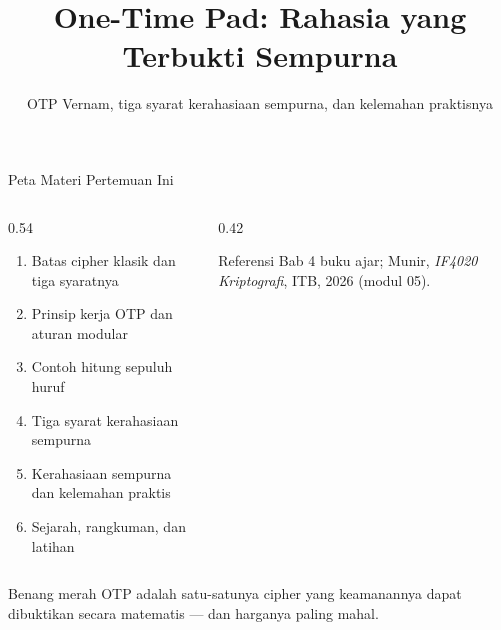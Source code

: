\documentclass[aspectratio=169,11pt]{beamer}
\title{One-Time Pad: Rahasia yang Terbukti Sempurna}
\subtitle{OTP Vernam, tiga syarat kerahasiaan sempurna, dan kelemahan praktisnya}
\begin{document}
\begin{frame}[plain]
    \titlepage
\end{frame}

\begin{frame}{Peta Materi Pertemuan Ini}
    \footnotesize
    \begin{columns}[T,onlytextwidth]
        \begin{column}{0.54\textwidth}
            \begin{enumerate}
                \item Batas cipher klasik dan tiga syaratnya
                \item Prinsip kerja OTP dan aturan modular
                \item Contoh hitung sepuluh huruf
                \item Tiga syarat kerahasiaan sempurna
                \item Kerahasiaan sempurna dan kelemahan praktis
                \item Sejarah, rangkuman, dan latihan
            \end{enumerate}
        \end{column}
        \begin{column}{0.42\textwidth}
            \begin{block}{Referensi}
                \footnotesize
                Bab 4 buku ajar; Munir, \textit{IF4020 Kriptografi}, ITB,
                2026 (modul 05).
            \end{block}
        \end{column}
    \end{columns}
    \vspace{0.15cm}
    \begin{exampleblock}{Benang merah}
        OTP adalah satu-satunya cipher yang keamanannya dapat dibuktikan
        secara matematis --- dan harganya paling mahal.
    \end{exampleblock}
\end{frame}
\end{document}
